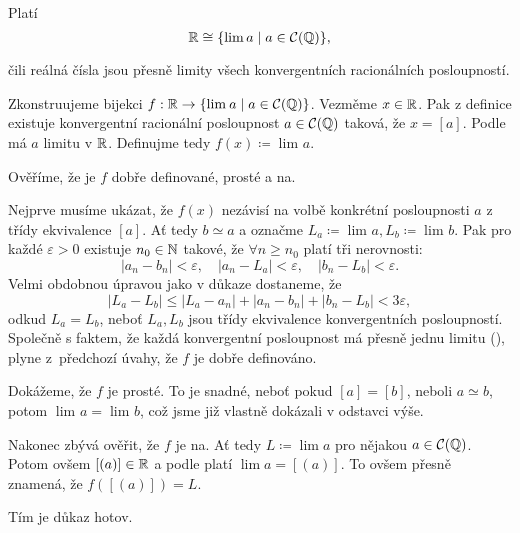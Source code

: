 \begin{corollary}{}{}
 Platí
 \[
  \mathbb{R} \cong \{\lim_{} a \mid a \in \mathcal{C}(\mathbb{Q})\},
 \]
 čili reálná čísla jsou přesně limity všech konvergentních racionálních
 posloupností.
\end{corollary}
\begin{corproof}
 Zkonstruujeme bijekci $f: \mathbb{R} \to \{\lim_{} a \mid a \in \mathcal{C}(\mathbb{Q})\}$.
 Vezměme $x \in \mathbb{R}$. Pak z definice existuje konvergentní racionální posloupnost
 $a \in \mathcal{C}(\mathbb{Q})$ taková, že $x = [a]$. Podle
  má $a$ limitu v $\mathbb{R}$.
 Definujme tedy $f(x) \coloneqq \lim_{} a$.

 Ověříme, že je $f$ dobře definované, prosté a na.

 Nejprve musíme ukázat, že $f(x)$ nezávisí na volbě konkrétní posloupnosti $a$ z
 třídy ekvivalence $[a]$. Ať tedy $b \simeq a$ a označme $L_a \coloneqq \lim_{}
 a, L_b \coloneqq \lim_{} b$. Pak pro každé $\varepsilon>0$ existuje $n_0 \in
 \mathbb{N}$ takové, že $ \forall n \geq n_0$ platí tři nerovnosti:
 \[
  |a_n-b_n|<\varepsilon, \quad |a_n-L_a|<\varepsilon, \quad
  |b_n-L_b|<\varepsilon.
 \]
 Velmi obdobnou úpravou jako v důkaze 
 dostaneme,
 že
 \[
  |L_a - L_b| \leq |L_a - a_n| + |a_n - b_n| + |b_n - L_b| < 3\varepsilon,
 \]
 odkud $L_a = L_b$, neboť $L_a,L_b$ jsou třídy ekvivalence konvergentních
 posloupností. Společně s faktem, že každá konvergentní posloupnost má přesně
 jednu limitu (), plyne z~předchozí
 úvahy, že $f$ je dobře definováno.

 Dokážeme, že $f$ je prosté. To je snadné, neboť pokud $[a] = [b]$, neboli $a
 \simeq b$, potom $\lim_{} a = \lim_{} b$, což jsme již vlastně dokázali v
 odstavci výše.

 Nakonec zbývá ověřit, že $f$ je na. Ať tedy $L \coloneqq \lim a$ pro nějakou $a
 \in \mathcal{C}(\mathbb{Q})$. Potom ovšem $[(a)] \in \mathbb{R}$ a podle
  platí $\lim a = [(a)]$. To
 ovšem přesně znamená, že $f([(a)]) = L$.

 Tím je důkaz hotov.
\end{corproof}
